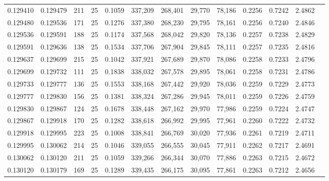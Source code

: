 \begin{tabular}{rrrrrrrrrrrrr}
0.129410 & 0.129479 &   211 &  25 &                                     0.1059 & 337,209 & 268,401 &  29,770 &  78,186 & 0.2256 & 0.7242 & 2.4862 \\
0.129480 & 0.129536 &   171 &  25 &                                     0.1276 & 337,380 & 268,230 &  29,795 &  78,161 & 0.2256 & 0.7240 & 2.4846 \\
0.129536 & 0.129591 &   188 &  25 &                                     0.1174 & 337,568 & 268,042 &  29,820 &  78,136 & 0.2257 & 0.7238 & 2.4829 \\
0.129591 & 0.129636 &   138 &  25 &                                     0.1534 & 337,706 & 267,904 &  29,845 &  78,111 & 0.2257 & 0.7235 & 2.4816 \\
0.129637 & 0.129699 &   215 &  25 &                                     0.1042 & 337,921 & 267,689 &  29,870 &  78,086 & 0.2258 & 0.7233 & 2.4796 \\
0.129699 & 0.129732 &   111 &  25 &                                     0.1838 & 338,032 & 267,578 &  29,895 &  78,061 & 0.2258 & 0.7231 & 2.4786 \\
0.129733 & 0.129777 &   136 &  25 &                                     0.1553 & 338,168 & 267,442 &  29,920 &  78,036 & 0.2259 & 0.7229 & 2.4773 \\
0.129777 & 0.129830 &   156 &  25 &                                     0.1381 & 338,324 & 267,286 &  29,945 &  78,011 & 0.2259 & 0.7226 & 2.4759 \\
0.129830 & 0.129867 &   124 &  25 &                                     0.1678 & 338,448 & 267,162 &  29,970 &  77,986 & 0.2259 & 0.7224 & 2.4747 \\
0.129867 & 0.129918 &   170 &  25 &                                     0.1282 & 338,618 & 266,992 &  29,995 &  77,961 & 0.2260 & 0.7222 & 2.4732 \\
0.129918 & 0.129995 &   223 &  25 &                                     0.1008 & 338,841 & 266,769 &  30,020 &  77,936 & 0.2261 & 0.7219 & 2.4711 \\
0.129995 & 0.130062 &   214 &  25 &                                     0.1046 & 339,055 & 266,555 &  30,045 &  77,911 & 0.2262 & 0.7217 & 2.4691 \\
0.130062 & 0.130120 &   211 &  25 &                                     0.1059 & 339,266 & 266,344 &  30,070 &  77,886 & 0.2263 & 0.7215 & 2.4672 \\
0.130120 & 0.130179 &   169 &  25 &                                     0.1289 & 339,435 & 266,175 &  30,095 &  77,861 & 0.2263 & 0.7212 & 2.4656 \\

\end{tabular}
